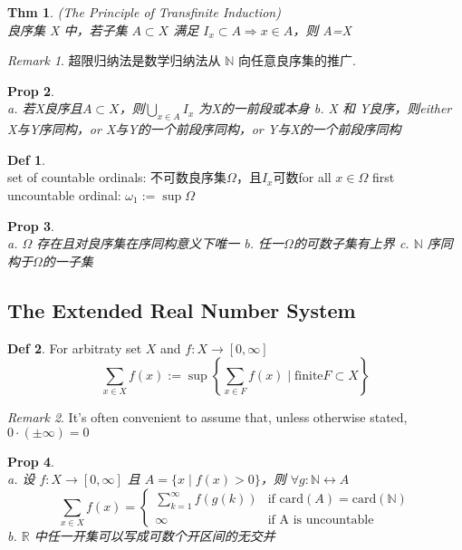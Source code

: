 \documentclass[hidelinks]{article}
\theoremstyle{definition}
\newtheorem*{defin}{Def}
\theoremstyle{plain}
\newtheorem{theorem}{Thm}[section]
\newtheorem{proposition}[theorem]{Prop}
\theoremstyle{remark}
\newtheorem*{remark}{Remark}
\begin{document}
\begin{theorem}(The Principle of Transfinite Induction)~\\
良序集 X 中，若子集 $A\subset X$ 满足 $I_x\subset A\Rightarrow x\in A$，则 A=X
\end{theorem}

\begin{remark}
超限归纳法是数学归纳法从 $\mathbb{N}$ 向任意良序集的推广.
\end{remark}

\begin{proposition}~\\
a. 若X良序且$A\subset X$，则$\bigcup_{x\in A}I_x$ 为X的一前段或本身 \newline
b. X 和 Y良序，则either X与Y序同构，or X与Y的一个前段序同构，or Y与X的一个前段序同构
\end{proposition}

\begin{defin}~\\
set of countable ordinals: 不可数良序集$\Omega$，且$I_x$可数for all $x\in \Omega$ \newline
first uncountable ordinal: $\omega_1:=\sup \Omega$
\end{defin}

\begin{proposition}~\\
a. $\Omega$ 存在且对良序集在序同构意义下唯一 \newline
b. 任一$\Omega$的可数子集有上界 \newline
c. $\mathbb{N}$ 序同构于$\Omega$的一子集
\end{proposition}

\subsection{The Extended Real Number System}
\begin{defin}
For arbitraty set $X$ and $f:X\to [0,\infty]$
$$\sum_{x\in X}f(x):=\sup\left\{\sum_{x\in F}f(x)\mid \textrm{finite} F\subset X\right\}$$
\end{defin}

\begin{remark}
It's often convenient to assume that, unless otherwise stated, $0\cdot (\pm \infty)=0$
\end{remark}

\begin{proposition}~\\
a. 设 $f:X\to [0,\infty]$ 且 $A=\{x\mid f(x)>0\}$，则 $\forall g: \mathbb{N}\leftrightarrow A$
\begin{displaymath}
\sum_{x\in X}f(x) = \left\{ \begin{array}{ll}
\sum\limits_{k=1}^{\infty}f(g(k)) & \textrm{if }\mathrm{card}(A)=\mathrm{card}(\mathbb{N})\\
\infty & \textrm{if A is uncountable}
\end{array} \right.
\end{displaymath}
b. $\mathbb{R}$ 中任一开集可以写成可数个开区间的无交并
\end{proposition}
\end{document}
